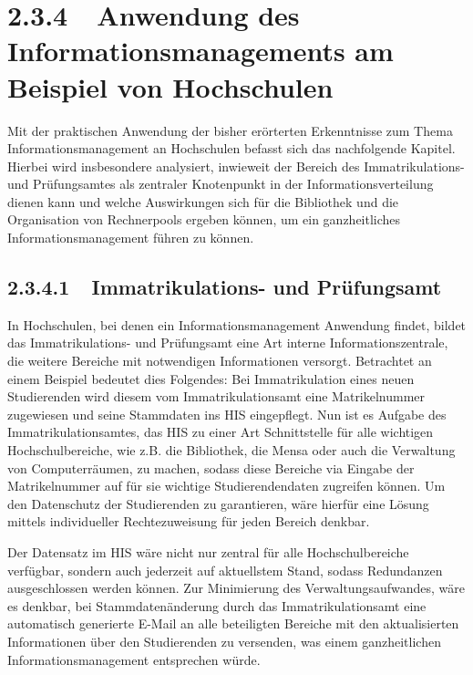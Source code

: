 \documentclass{article}
\begin{document}
\section[2.3.4\ \ Anwendung des Informationsmanagements am Beispiel von Hochschulen]{2.3.4\ \ Anwendung des
Informationsmanagements am Beispiel von Hochschulen}
Mit der praktischen Anwendung der bisher erörterten Erkenntnisse zum Thema Informationsmanagement an Hochschulen befasst
sich das nachfolgende Kapitel. Hierbei wird insbesondere analysiert, inwieweit der Bereich des Immatrikulations- und
Prüfungsamtes als zentraler Knotenpunkt in der Informationsverteilung dienen kann und welche Auswirkungen sich für die
Bibliothek und die Organisation von Rechnerpools ergeben können, um ein ganzheitliches Informationsmanagement führen zu
können.

\subsection[2.3.4.1\ \ Immatrikulations{}- und Prüfungsamt ]{2.3.4.1\ \ Immatrikulations- und Prüfungsamt }
In Hochschulen, bei denen ein Informationsmanagement Anwendung findet, bildet das Immatrikulations- und Prüfungsamt eine
Art interne Informationszentrale, die weitere Bereiche mit notwendigen Informationen versorgt. Betrachtet an einem
Beispiel bedeutet dies Folgendes: Bei Immatrikulation eines neuen Studierenden wird diesem vom Immatrikulationsamt eine
Matrikelnummer zugewiesen und seine Stammdaten ins HIS eingepflegt. Nun ist es Aufgabe des Immatrikulationsamtes, das
HIS zu einer Art Schnittstelle für alle wichtigen Hochschulbereiche, wie z.B. die Bibliothek, die Mensa oder auch die
Verwaltung von Computerräumen, zu machen, sodass diese Bereiche via Eingabe der Matrikelnummer auf für sie wichtige
Studierendendaten zugreifen können. Um den Datenschutz der Studierenden zu garantieren, wäre hierfür eine Lösung
mittels individueller Rechtezuweisung für jeden Bereich denkbar. 


\bigskip

Der Datensatz im HIS wäre nicht nur zentral für alle Hochschulbereiche verfügbar, sondern auch jederzeit auf aktuellstem
Stand, sodass Redundanzen ausgeschlossen werden können. Zur Minimierung des Verwaltungsaufwandes, wäre es denkbar, bei
Stammdatenänderung durch das Immatrikulationsamt eine automatisch generierte E-Mail an alle beteiligten Bereiche mit
den aktualisierten Informationen über den Studierenden zu versenden, was einem ganzheitlichen Informationsmanagement
entsprechen würde.
\end{document}
